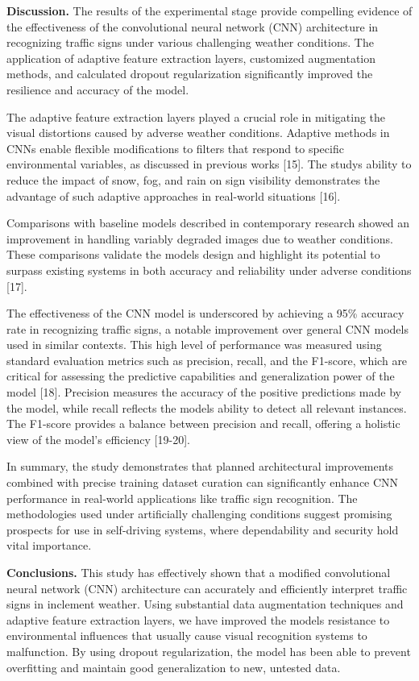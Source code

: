 \begin{multicols}{2}
{\bfseries Discussion.} The results of the experimental stage provide
compelling evidence of the effectiveness of the convolutional neural
network (CNN) architecture in recognizing traffic signs under various
challenging weather conditions. The application of adaptive feature
extraction layers, customized augmentation methods, and calculated
dropout regularization significantly improved the resilience and
accuracy of the model.

The adaptive feature extraction layers played a crucial role in
mitigating the visual distortions caused by adverse weather conditions.
Adaptive methods in CNNs enable flexible modifications to filters that
respond to specific environmental variables, as discussed in previous
works {[}15{]}. The study\textquotesingle s ability to reduce the impact
of snow, fog, and rain on sign visibility demonstrates the advantage of
such adaptive approaches in real-world situations {[}16{]}.

Comparisons with baseline models described in contemporary research
showed an improvement in handling variably degraded images due to
weather conditions. These comparisons validate the
model\textquotesingle s design and highlight its potential to surpass
existing systems in both accuracy and reliability under adverse
conditions {[}17{]}.

The effectiveness of the CNN model is underscored by achieving a 95\%
accuracy rate in recognizing traffic signs, a notable improvement over
general CNN models used in similar contexts. This high level of
performance was measured using standard evaluation metrics such as
precision, recall, and the F1-score, which are critical for assessing
the predictive capabilities and generalization power of the model
{[}18{]}. Precision measures the accuracy of the positive predictions
made by the model, while recall reflects the model\textquotesingle s
ability to detect all relevant instances. The F1-score provides a
balance between precision and recall, offering a holistic view of the
model's efficiency {[}19-20{]}.

In summary, the study demonstrates that planned architectural
improvements combined with precise training dataset curation can
significantly enhance CNN performance in real-world applications like
traffic sign recognition. The methodologies used under artificially
challenging conditions suggest promising prospects for use in
self-driving systems, where dependability and security hold vital
importance.

{\bfseries Conclusions.} This study has effectively shown that a modified
convolutional neural network (CNN) architecture can accurately and
efficiently interpret traffic signs in inclement weather. Using
substantial data augmentation techniques and adaptive feature extraction
layers, we have improved the model\textquotesingle s resistance to
environmental influences that usually cause visual recognition systems
to malfunction. By using dropout regularization, the model has been able
to prevent overfitting and maintain good generalization to new, untested
data.


\end{multicols}
